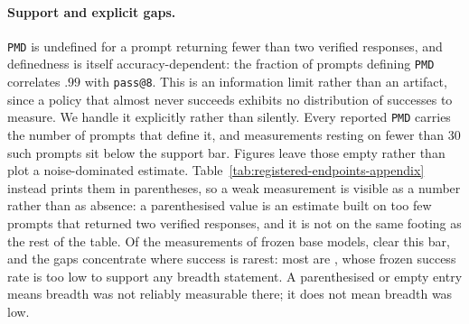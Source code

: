 \documentclass{article}
\newcommand{\1}{\mathbf 1}
\newcommand{\pmd}{\texttt{PMD}}
\theoremstyle{remark}
\theoremstyle{definition}
\theoremstyle{plain}
\begin{document}
\paragraph{Support and explicit gaps.}
\pmd{} is undefined for a prompt returning fewer than two verified responses,
and definedness is itself accuracy-dependent: the fraction of prompts defining
\pmd{} correlates $.99$ with \texttt{pass@8}. This is an information limit
rather than an artifact, since a policy that almost never succeeds exhibits no
distribution of successes to measure. We handle it explicitly rather than
silently. Every reported \pmd{} carries the number of prompts that define it, and
measurements resting on fewer than 30 such prompts sit below the support bar.
Figures leave those empty rather than plot a noise-dominated estimate.
Table~\ref{tab:registered-endpoints-appendix} instead prints them in
parentheses, so a weak measurement is visible as a number rather than as
absence: a parenthesised value is an estimate built on too few prompts that
returned two verified responses, and it is not on the same footing as the rest
of the table. Of the \MDcells{} measurements of frozen base models, \MDreportable{} clear
this bar, and the gaps concentrate where success is rarest: most are
\MDtopgapdomain{}, whose frozen success rate is too low to support any
breadth statement. A parenthesised or empty entry means breadth was
not reliably measurable there; it does not mean breadth was low.
\end{document}
